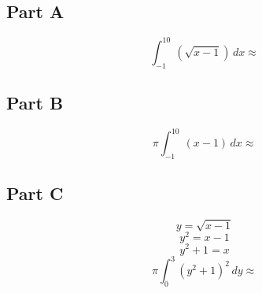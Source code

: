 \subsection{Part A}
\[ \int_{-1}^{10} (\sqrt{x - 1})\, dx \approx \]

\subsection{Part B}
\[ \pi\!\!\int_{-1}^{10} (x - 1)\, dx \approx \]

\subsection{Part C}
\[ y = \sqrt{x - 1} \]
\[ y^2 = x - 1 \]
\[ y^2 + 1 = x \]
\[ \pi\!\!\int_{0}^{3} (y^2 + 1)^2\,dy \approx \]
